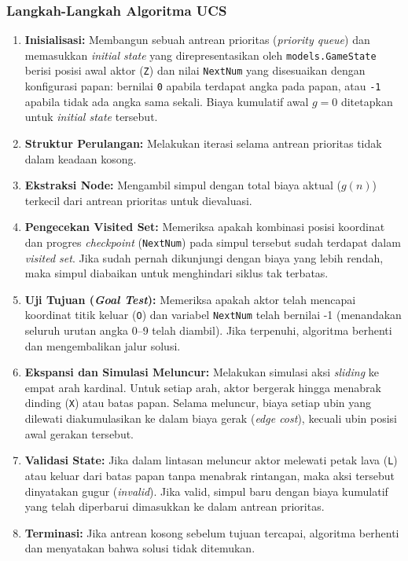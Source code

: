 \documentclass[12pt,a4paper]{article}
\begin{document}
\subsubsection{Langkah-Langkah Algoritma UCS}
\begin{enumerate}
\item \textbf{Inisialisasi:} Membangun sebuah antrean prioritas (\textit{priority queue}) dan memasukkan \textit{initial state} yang direpresentasikan oleh \texttt{models.GameState} berisi posisi awal aktor (\texttt{Z}) dan nilai \texttt{NextNum} yang disesuaikan dengan konfigurasi papan: bernilai \texttt{0} apabila terdapat angka pada papan, atau \texttt{-1} apabila tidak ada angka sama sekali. Biaya kumulatif awal $g = 0$ ditetapkan untuk \textit{initial state} tersebut.
\item \textbf{Struktur Perulangan:} Melakukan iterasi selama antrean prioritas tidak dalam keadaan kosong.
\item \textbf{Ekstraksi Node:} Mengambil simpul dengan total biaya aktual ($g(n)$) terkecil dari antrean prioritas untuk dievaluasi.
\item \textbf{Pengecekan Visited Set:} Memeriksa apakah kombinasi posisi koordinat dan progres \textit{checkpoint} (\texttt{NextNum}) pada simpul tersebut sudah terdapat dalam \textit{visited set}. Jika sudah pernah dikunjungi dengan biaya yang lebih rendah, maka simpul diabaikan untuk menghindari siklus tak terbatas.
\item \textbf{Uji Tujuan (\textit{Goal Test}):} Memeriksa apakah aktor telah mencapai koordinat titik keluar (\texttt{O}) dan variabel \texttt{NextNum} telah bernilai -1 (menandakan seluruh urutan angka 0--9 telah diambil). Jika terpenuhi, algoritma berhenti dan mengembalikan jalur solusi.
\item \textbf{Ekspansi dan Simulasi Meluncur:} Melakukan simulasi aksi \textit{sliding} ke empat arah kardinal. Untuk setiap arah, aktor bergerak hingga menabrak dinding (\texttt{X}) atau batas papan. Selama meluncur, biaya setiap ubin yang dilewati diakumulasikan ke dalam biaya gerak (\textit{edge cost}), kecuali ubin posisi awal gerakan tersebut.
\item \textbf{Validasi State:} Jika dalam lintasan meluncur aktor melewati petak lava (\texttt{L}) atau keluar dari batas papan tanpa menabrak rintangan, maka aksi tersebut dinyatakan gugur (\textit{invalid}). Jika valid, simpul baru dengan biaya kumulatif yang telah diperbarui dimasukkan ke dalam antrean prioritas.
\item \textbf{Terminasi:} Jika antrean kosong sebelum tujuan tercapai, algoritma berhenti dan menyatakan bahwa solusi tidak ditemukan.
\end{enumerate}
\end{document}
